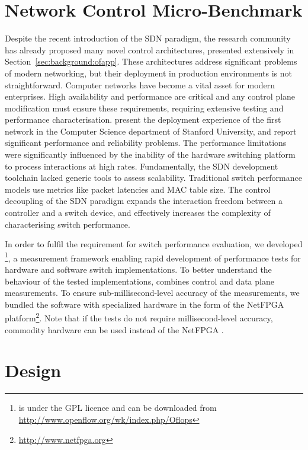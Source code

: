 \section{Network Control Micro-Benchmark} \label{sec:oflops-intro}

Despite the recent introduction of the SDN paradigm, the research community has
already proposed many novel control architectures, presented
extensively in Section~\ref{sec:background:ofapp}. These architectures address
significant problems of modern networking, but their deployment in production
environments is not straightforward.  Computer networks have become a vital asset
for modern enterprises.  High availability and performance are critical and any
control plane modification must ensure these requirements, requiring extensive
testing and performance characterisation.   present the
deployment experience of the first \of network in the Computer
Science department of Stanford University, and report significant performance and
reliability problems.  The performance limitations were significantly
influenced by the inability of the hardware switching platform to process \of
interactions at high rates.  Fundamentally, the SDN development toolchain lacked
generic tools to assess \of scalability.  Traditional switch performance models
use metrics like packet latencies and MAC table size. The control decoupling of
the SDN paradigm expands the interaction freedom between a controller and a
switch device, and effectively increases the complexity of characterising switch
performance. 

In order to fulfil the requirement for \of switch performance evaluation, we
developed \oflops\footnote{\oflops is under the GPL licence and can be
  downloaded from \url{http://www.openflow.org/wk/index.php/Oflops}}, a
measurement framework enabling rapid development of performance tests for
hardware and software \of switch implementations. To better understand the
behaviour of the tested \of implementations, \oflops combines
\of control and data plane measurements. To ensure
sub-millisecond-level accuracy of the measurements, we bundled the \oflops
software with specialized hardware in the form of the NetFPGA
platform\footnote{\url{http://www.netfpga.org}}.  Note that if the tests do not
require millisecond-level accuracy, commodity hardware can be used instead of
the NetFPGA .

\section{\oflops Design}\label{sec:oflops-design}


